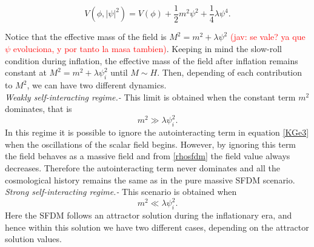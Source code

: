 \documentclass[amssymb,twocolumn,prd,nofootinbib,showpacs]{revtex4-1}
\newcommand{\jav}[1]{\textcolor{red}{(jav: #1)}}
\begin{document}
\begin{equation}
V(\phi,|\psi|^2)=V(\phi)+\frac{1}{2}m^2\psi^2+\frac{1}{4}\lambda\psi^4.
\end{equation}

Notice that the effective mass of the field is $M^2=m^2+\lambda\psi^2$ \jav{se vale? ya que $\psi$ evoluciona, y por tanto 
la masa tambien}. 
Keeping in mind the slow-roll condition during inflation, the effective mass of the field after inflation remains 
constant at $M^2=m^2+\lambda\psi_i^2$ until $M\sim H$. Then, depending of each contribution to $M^2$, we can 
have two different dynamics. 
\\

\textit{Weakly self-interacting regime.-} This limit is obtained when the constant term $m^2$ dominates, 
that is 
%
\begin{equation}\label{consw}
m^2\gg \lambda\psi_i^2.
\end{equation}
In this regime it is possible to ignore the autointeracting term in equation \eqref{KGe3} when the oscillations 
of the scalar field begins. 
However, by ignoring this term the field behaves as a massive field and from
\eqref{rhosfdm} the field value always decreases. Therefore the autointeracting term never dominates and 
all the cosmological history remains the same as in the pure massive SFDM scenario. 
\\

\textit{Strong self-interacting regime.-} This scenario is obtained when 
\begin{equation}
m^2\ll \lambda\psi_i^2.
\end{equation}
%
Here the SFDM follows an attractor solution during the inflationary era, and 
hence within this solution we have two different cases, depending on the attractor solution values.
\\
\end{document}
